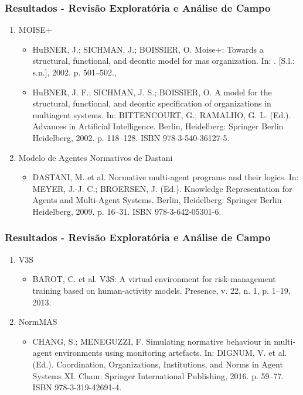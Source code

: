 \documentclass{beamer}
\begin{document}
\begin{frame}
	\frametitle{Resultados - Revisão Exploratória e Análise de Campo}
 	\begin{enumerate}
		\item MOISE+
		\begin{itemize}
		 	\item HuBNER, J.; SICHMAN, J.; BOISSIER, O. Moise+: Towards a structural, functional, and deontic model for mas organization. In: . [S.l.: s.n.], 2002. p. 501–502., 
			\item HuBNER, J. F.; SICHMAN, J. S.; BOISSIER, O. A model for the structural, functional, and deontic specification of organizations in multiagent systems. In: BITTENCOURT, G.; RAMALHO, G. L. (Ed.). Advances in Artificial Intelligence. Berlin, Heidelberg: Springer Berlin Heidelberg, 2002. p. 118–128. ISBN 978-3-540-36127-5.
		\end{itemize}
		\item Modelo de Agentes Normativos de Dastani
		\begin{itemize}
			\item DASTANI, M. et al. Normative multi-agent programs and their logics. In: MEYER, J.-J. C.; BROERSEN, J. (Ed.). Knowledge Representation for Agents and Multi-Agent Systems. Berlin, Heidelberg: Springer Berlin Heidelberg, 2009. p. 16–31. ISBN 978-3-642-05301-6.
		\end{itemize}
	\end{enumerate}
\end{frame}

\begin{frame}
	\frametitle{Resultados - Revisão Exploratória e Análise de Campo}
 	\begin{enumerate}
		\item V3S
		\begin{itemize}
			\item BAROT, C. et al. V3S: A virtual environment for risk-management training based on human-activity models. Presence, v. 22, n. 1, p. 1–19, 2013.
		\end{itemize}
		\item NormMAS
		\begin{itemize}
			\item CHANG, S.; MENEGUZZI, F. Simulating normative behaviour in multi-agent environments using monitoring artefacts. In: DIGNUM, V. et al. (Ed.). Coordination, Organizations, Institutions, and Norms in Agent Systems XI. Cham: Springer International Publishing, 2016. p. 59–77. ISBN 978-3-319-42691-4.
		\end{itemize}

	\end{enumerate}
\end{frame}
\end{document}
